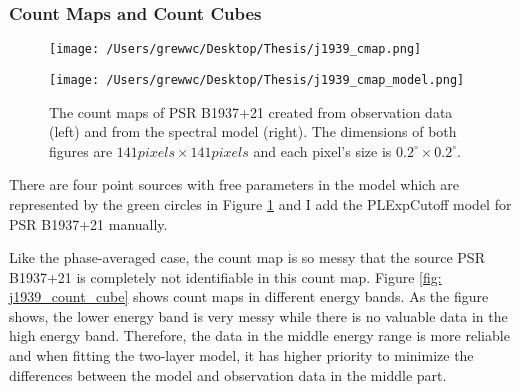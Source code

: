 \documentclass[12pt]{report}
\begin{document}
          \subsubsection{Count Maps and Count Cubes}
            \begin{figure}[!ht]
              \begin{center}
              \begin{minipage}{0.45\textwidth}
                \begin{center} 
                  \texttt{[image: /Users/grewwc/Desktop/Thesis/j1939\_cmap.png]}
                \end{center}
              \end{minipage}
              \begin{minipage}{0.45\textwidth}
                \begin{center}
                  \texttt{[image: /Users/grewwc/Desktop/Thesis/j1939\_cmap\_model.png]}
                \end{center}
              \end{minipage}
            \end{center}
 
          \caption{The count maps of PSR B1937+21 created from observation 
              data (\textsf{left}) and from the spectral model (\textsf{right}). The dimensions
              of both figures are $141 pixels \times 141 pixels$ and each pixel's size is
              $0.2^{\circ}\times0.2^{\circ}$.}
            \label{fig: j1939_count_map}
          \end{figure}

          There are four point sources with free parameters in the model which are represented 
          by the green circles in Figure \ref{fig: j1939_count_map} and I add the PLExpCutoff model 
          for PSR B1937+21 manually. 

          Like the phase-averaged case, the count map is so messy that the source PSR B1937+21 
          is completely not identifiable in this count map.  
          Figure \ref{fig: j1939_count_cube} shows count maps in different energy bands. As 
          the figure shows, the lower energy band is very messy while there is no valuable  
          data in the high energy band. Therefore, the data in the middle energy range is 
          more reliable and when fitting the two-layer model, it has higher priority to 
          minimize the differences between the model and observation data in the middle part.
\end{document}
